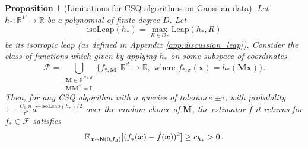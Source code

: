 \documentclass[11pt]{article}
\newcommand{\E}{\mathbb{E}}
\newcommand{\R}{\mathbb{R}}
\newcommand{\<}{\langle}
\renewcommand{\>}{\rangle}
\newtheorem{proposition}{Proposition}
\theoremstyle{definition}
\def\bI{{\boldsymbol I}}
\def\bM{{\boldsymbol M}}
\def\bx{{\boldsymbol x}}
\def\cO{{\mathcal O}}
\def\cF{{\mathcal F}}
\def\cO{{\mathcal O}}
\def\normal{{\sf N}}
\def\normal{{\sf N}}
\def\normal{{\sf N}}
\def\bx{{\boldsymbol x}}
\def\cF{{\mathcal F}}
\def\normal{{\sf N}}
\begin{document}
\begin{proposition}[Limitations for CSQ algorithms on Gaussian data]\label{prop:isoleap-csq-gaussian} Let $h_* : \R^P \to \R$ be a polynomial of finite degree $D$. Let 
\[
\mathrm{isoLeap}(h_*) = \max_{R \in \cO_P} \mathrm{Leap}(h_*, R)
\]
be its isotropic leap (as defined in Appendix \ref{app:discussion_leap}). Consider the class of functions which given by applying $h_*$ on some subspace of coordinates $$\cF = \bigcup_{\substack{\bM \in \R^{P \times d} \\ \bM\bM^\top = \bI}}\{f_{*,\bM} : \R^d \to \R, \mbox{ where } f_{*,\sigma}(\bx) = h_*(\bM\bx)\}.$$
Then, for any CSQ algorithm with $n$ queries of tolerance $\pm \tau$, with probability $1 - \frac{C_{h_*}n}{\tau^2}d^{-\mathrm{isoLeap}(h_*)/2}$ over the random choice of $\bM$, the estimator $\hat{f}$ it returns for $f_* \in \cF$ satisfies
\begin{align*}
\E_{\bx \sim \normal(0,I_d)}[(f_*(\bx) - \hat{f}(\bx))^2] \geq c_{h_*} > 0\,.
\end{align*}
\end{proposition}
\end{document}
